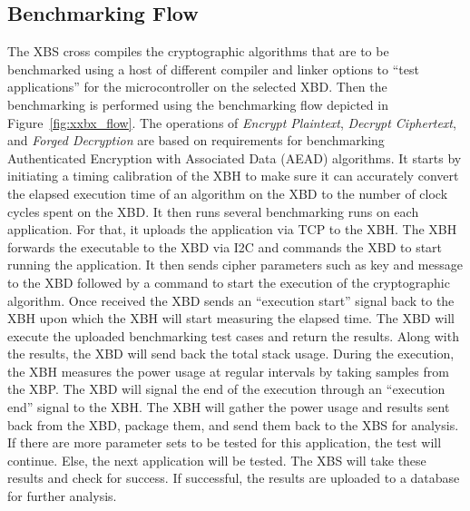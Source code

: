\documentclass[10pt]{article}
\begin{document}
\subsection{Benchmarking Flow}
The XBS cross compiles the cryptographic algorithms that are to be benchmarked 
using a host of different compiler and linker options to ``test applications'' for the 
microcontroller on the selected XBD. 
Then the benchmarking is performed using the benchmarking flow depicted in Figure~\ref{fig:xxbx_flow}. 
The operations of \emph{Encrypt Plaintext}, \emph{Decrypt Ciphertext}, and \emph{Forged Decryption} are based on 
requirements for benchmarking Authenticated Encryption with Associated Data (AEAD) algorithms.
It starts by initiating a 
timing calibration of the XBH to make sure it can accurately convert the elapsed execution time
of an algorithm on the XBD to the number of clock cycles spent on the XBD.
It then runs several benchmarking runs on each application. 
For that, it uploads the application via TCP to the XBH.
The XBH forwards the executable to the XBD via I2C and commands the XBD to start 
running the application. It then sends cipher parameters such as key and message
to the XBD followed by a command to start the execution of the cryptographic
algorithm. Once received the XBD sends an ``execution start'' signal back to the
XBH upon which the XBH will start measuring the elapsed time.
The XBD will execute the uploaded benchmarking test cases and return the results. 
Along with the results, the XBD will send back
the total stack usage.
During the execution, the XBH measures the power usage at regular intervals by taking 
samples from the XBP. The XBD will signal the end of the execution through an 
``execution end'' signal to the XBH. The XBH will gather the power 
usage and results sent back from the XBD, package them, and send them back to the XBS 
for analysis.
If there are more parameter sets to be tested for this application, the test will 
continue. Else, the next application will be tested.
The XBS will take these results and check for success. If successful, the results are 
uploaded to a database for further analysis. 
\end{document}
